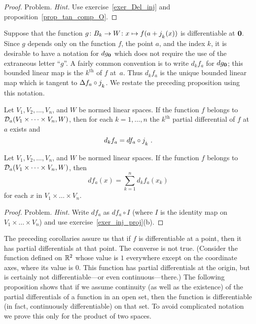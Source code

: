 \begin{proof} Problem.   \emph{Hint.}  Use exercise~\ref{exer_Del_inj} and
proposition~\ref{prop_tan_comp_O}.
\ns  \end{proof}

\begin{notn}  Suppose that the function $g\colon  B_k \rightarrow W\colon x \mapsto f(a +
j_{{}_{{\scriptstyle{k}}}}(x))$ is differentiable at $\mathbf{0}$.  Since $g$ depends only on the function
$f$, the point $a$, and the index $k$, it is desirable to have a notation for $dg_{\mathbf{0}}$
which does not require the use of the extraneous letter ``$g$''.  A fairly common convention
is to write $d_kf_a$ for $dg_{\mathbf{0}}$; this bounded linear map is the $k^{\text {th}}$
 of $f$ at~$a$.  Thus $d_kf_a$ is the unique bounded linear map which
is tangent to $\Delta f_a \circ j_{{}_{{\scriptstyle{k}}}}$.  We restate the preceding proposition using
this notation.
\end{notn}

\begin{cor}\label{cor_dffntl_inj}  Let $V_1, V_2, \dots ,V_n$, and $W$ be normed linear spaces.
If the function $f$ belongs to $ \mathcal{D}_a(V_1 \times \dots \times V_n, W)$, then for each $k =
1,\dots ,n$ the $k^{\text{th}}$ partial differential of $f$ at $a$ exists and
  \[ d_kf_a = df_a \circ j_{{}_{{\scriptstyle{k}}}}\;. \]
\end{cor}

\begin{cor}   Let $V_1, V_2, \dots ,V_n$, and $W$ be normed linear spaces.  If the function $f$
belongs to $ \mathcal{D}_a(V_1 \times \dots \times V_n, W)$, then
  \[ df_a(x) = \sum\limits_{k=1}^n d_kf_a(x_k) \]
for each $x$ in $V_1\times \dots\times V_n$.
\end{cor}


\begin{proof} Problem.    \emph{Hint.}  Write $df_a$ as $df_a \circ I$ (where $I$ is the identity
map on $V_1 \times \dots \times V_n$) and use exercise~\ref{exer_inj_proj}(b).    \ns
\end{proof}

The preceding corollaries assure us that if $f$ is differentiable at a point, then it has
partial differentials at that point.  The converse is not true.  (Consider the function
defined on $\mathbb{R}^2$ whose value is $1$ everywhere except on the coordinate axes, where its value
is $0$.  This function has partial differentials at the origin, but is certainly not
differentiable---or even continuous---there.)  The following proposition shows that if we
assume continuity (as well as the existence) of the partial differentials of a function in an
open set, then the function is differentiable (in fact, continuously differentiable) on that
set. To avoid complicated notation we prove this only for the product of two spaces.

